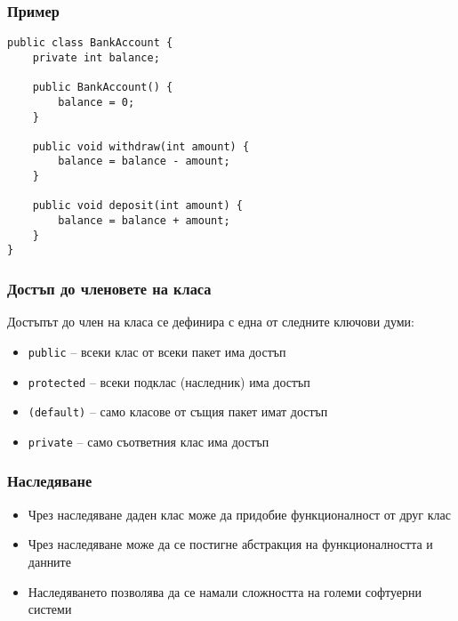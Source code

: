 \documentclass[ignorenonframetext, hyperref=unicode,compress]{beamer}
\begin{document}
\begin{frame}[containsverbatim]\frametitle{Пример}
\begin{lstlisting}
public class BankAccount {
 	private int balance;

 	public BankAccount() {
 		balance = 0;
	}

 	public void withdraw(int amount) {
 		balance = balance - amount;
	}

 	public void deposit(int amount) {
 		balance = balance + amount;
	}
}
\end{lstlisting}
\end{frame}

\begin{frame}[containsverbatim]\frametitle{Достъп до членовете на класа}
Достъпът до член на класа се дефинира с една от следните ключови думи:
\begin{itemize}
 \item \lstinline{public} -- всеки клас от всеки пакет има достъп
 \item \lstinline{protected} -- всеки подклас (наследник) има достъп
 \item \lstinline{(default)} -- само класове от същия пакет имат достъп
 \item \lstinline{private} -- само съответния клас има достъп
\end{itemize}
\end{frame}

\begin{frame}[containsverbatim]\frametitle{Наследяване}
\begin{itemize}
 \item Чрез наследяване даден клас може да придобие функционалност от друг клас
 \item Чрез наследяване може да се постигне абстракция на функционалността и данните
 \item Наследяването позволява да се намали сложността на големи софтуерни системи
\end{itemize}
\end{frame}
\end{document}
